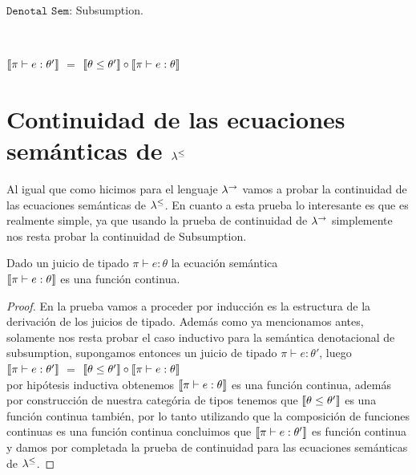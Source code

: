\noindent
$\texttt{Denotal Sem:}$ Subsumption.\

\

$\llbracket \pi \vdash e : \theta' \rrbracket$ $=$ $\llbracket \theta \leq \theta' \rrbracket \circ \llbracket \pi \vdash e : \theta \rrbracket$

\section{Continuidad de las ecuaciones sem\'anticas de $\lambda^{\leq}$}

Al igual que como hicimos para el lenguaje $\lambda^{\rightarrow}$ vamos a probar la
continuidad de las ecuaciones sem\'anticas de $\lambda^{\leq}$. En cuanto a 
esta prueba lo interesante es que es realmente simple, ya que usando la 
prueba de continuidad de $\lambda^{\rightarrow}$ simplemente nos resta probar 
la continuidad de Subsumption.

\begin{theorem}

Dado un juicio de tipado $\pi \vdash e : \theta$ la ecuaci\'on sem\'antica
\\ 
$\llbracket \pi \vdash e : \theta \rrbracket$ es una funci\'on continua.

\end{theorem}

\begin{proof}

En la prueba vamos a proceder por inducci\'on es la estructura de la derivaci\'on 
de los juicios de tipado. Adem\'as como ya mencionamos antes, solamente nos resta
probar el caso inductivo para la sem\'antica denotacional de subsumption, supongamos
entonces un juicio de tipado $\pi \vdash e : \theta'$, luego\\

$\llbracket \pi \vdash e : \theta' \rrbracket$ $=$ $\llbracket \theta \leq \theta' \rrbracket \circ \llbracket \pi \vdash e : \theta \rrbracket$\\

por hip\'otesis inductiva obtenemos $\llbracket \pi \vdash e : \theta \rrbracket$ es una funci\'on
continua, adem\'as por construcci\'on de nuestra categ\'oria de tipos
tenemos que $\llbracket \theta \leq \theta' \rrbracket$ es una funci\'on continua tambi\'en, 
por lo tanto utilizando que la composici\'on de funciones continuas es una funci\'on
continua concluimos que $\llbracket \pi \vdash e : \theta' \rrbracket$ es funci\'on continua y
damos por completada la prueba de continuidad para las ecuaciones sem\'anticas
de $\lambda^{\leq}$.

\end{proof}


